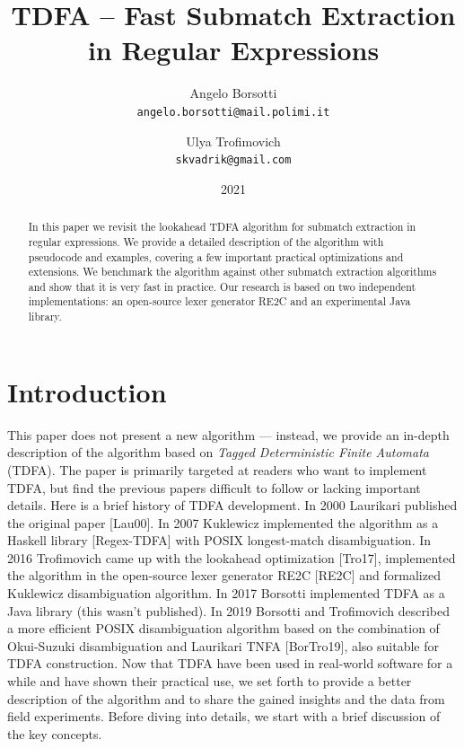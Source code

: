 \documentclass[]{article}
\begin{document}
\title{TDFA -- Fast Submatch Extraction in Regular Expressions}
\author{
    Angelo Borsotti \\
    \texttt{\small{angelo.borsotti@mail.polimi.it}}
\and
    Ulya Trofimovich \\
    \texttt{\small{skvadrik@gmail.com}}
}
\date{2021}

\maketitle

\begin{abstract}
In this paper we revisit the lookahead TDFA algorithm for submatch extraction in regular expressions.
We provide a detailed description of the algorithm with pseudocode and examples, covering a few important practical optimizations and extensions.
We benchmark the algorithm against other submatch extraction algorithms and show that it is very fast in practice.
Our research is based on two independent implementations: an open-source lexer generator RE2C and an experimental Java library.
\end{abstract}

\section*{Introduction}
This paper does not present a new algorithm --- instead, we provide an in-depth description of the algorithm based on \emph{Tagged Deterministic Finite Automata} (TDFA).
The paper is primarily targeted at readers who want to implement TDFA,
but find the previous papers difficult to follow or lacking important details.
%
Here is a brief history of TDFA development.
In 2000 Laurikari published the original paper [Lau00].
In 2007 Kuklewicz implemented the algorithm as a Haskell library [Regex-TDFA] with POSIX longest-match disambiguation.
In 2016 Trofimovich came up with the lookahead optimization [Tro17], implemented the algorithm in the open-source lexer generator RE2C [RE2C] and formalized Kuklewicz disambiguation algorithm.
In 2017 Borsotti implemented TDFA as a Java library (this wasn't published).
In 2019 Borsotti and Trofimovich described a more efficient POSIX disambiguation algorithm based on the combination of Okui-Suzuki disambiguation and Laurikari TNFA [BorTro19],
also suitable for TDFA construction.
%
Now that TDFA have been used in real-world software for a while and have shown their practical use,
we set forth to provide a better description of the algorithm and to share the gained insights and the data from field experiments.
Before diving into details, we start with a brief discussion of the key concepts.
\\
\end{document}
